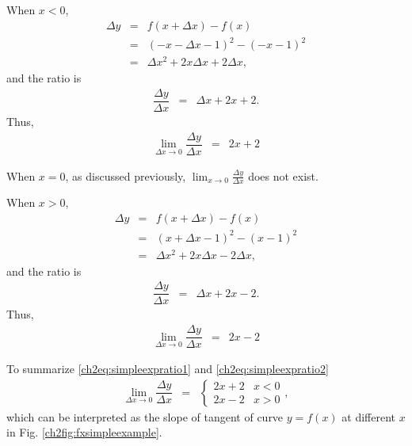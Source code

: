 When $x<0$,
\begin{eqnarray}
  \Delta y &=& f\left(x + \Delta x\right) - f(x) \nonumber \\
   &=& \left(-x - \Delta x - 1\right)^2 - \left(-x - 1\right)^2 \nonumber \\
   &=& \Delta x^2 + 2x\Delta x + 2\Delta x, \nonumber
\end{eqnarray}
and the ratio is
\begin{eqnarray}
  \dfrac{\Delta y}{\Delta x} &=& \Delta x + 2x + 2. \nonumber
\end{eqnarray}
Thus,
\begin{eqnarray}
  \lim_{\Delta x\rightarrow 0} \dfrac{\Delta y}{\Delta x} &=& 2x + 2 \label{ch2eq:simpleexpratio1}
\end{eqnarray}

When $x=0$, as discussed previously, $\lim_{x\rightarrow 0} \frac{\Delta y}{\Delta x}$ does not exist.

When $x>0$,
\begin{eqnarray}
  \Delta y &=& f\left(x + \Delta x\right) - f(x) \nonumber \\
   &=& \left(x + \Delta x - 1\right)^2 - \left(x - 1\right)^2 \nonumber \\
   &=& \Delta x^2 + 2x\Delta x - 2\Delta x, \nonumber
\end{eqnarray}
and the ratio is
\begin{eqnarray}
  \dfrac{\Delta y}{\Delta x} &=& \Delta x + 2x - 2. \nonumber
\end{eqnarray}
Thus,
\begin{eqnarray}
  \lim_{\Delta x\rightarrow 0} \dfrac{\Delta y}{\Delta x} &=& 2x - 2 \label{ch2eq:simpleexpratio2}
\end{eqnarray}

To summarize \eqref{ch2eq:simpleexpratio1} and \eqref{ch2eq:simpleexpratio2}
\begin{eqnarray}
  \lim_{\Delta x\rightarrow 0} \dfrac{\Delta y}{\Delta x} &=& \left\{\begin{array}{cc}
                                                                2x + 2 & x < 0 \\
                                                                2x - 2 & x > 0
                                                              \end{array}\right., \label{ch2eq:simpleexpgeneralratio}
\end{eqnarray}
which can be interpreted as the slope of tangent of curve $y=f(x)$ at different $x$ in Fig. \ref{ch2fig:fxsimpleexample}.

